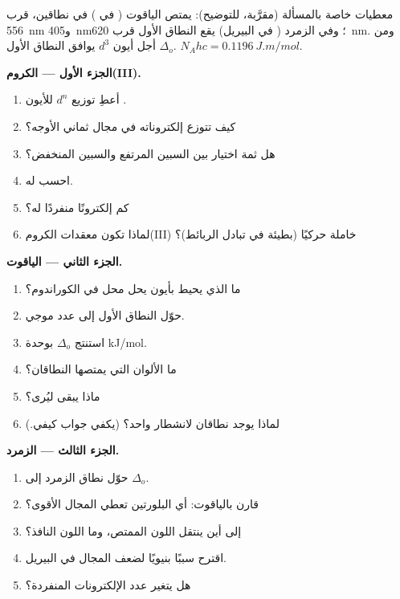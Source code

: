 \begin{problem}
\label{pb:b2:ligand-field:1}
معطيات خاصة بالمسألة (مقرَّبة، للتوضيح): يمتص الياقوت ( في )
في نطاقين، قرب \qty{556}{nm} و\qty{405}{nm}؛ وفي الزمرد ( في البيريل) يقع
النطاق الأول قرب \qty{620}{nm}. ومن أجل أيون $d^3$ يوافق النطاق الأول
$\Delta_o$. $N_Ahc = \qty{0.1196}{J.m/mol}$.

\medskip
\noindent\textbf{الجزء الأول --- الكروم(III).}
\begin{enumerate}
  \item أعطِ توزيع $d^n$ للأيون .
  \item كيف تتوزع إلكتروناته في مجال ثماني الأوجه؟
  \item هل ثمة اختيار بين السبين المرتفع والسبين المنخفض؟
  \item احسب  له.
  \item كم إلكترونًا منفردًا له؟
  \item لماذا تكون معقدات الكروم(III) خاملة حركيًا (بطيئة في تبادل الربائط)؟
\end{enumerate}

\medskip
\noindent\textbf{الجزء الثاني --- الياقوت.}
\begin{enumerate}[resume]
  \item ما الذي يحيط بأيون  يحل محل  في الكوراندوم؟
  \item حوّل النطاق الأول إلى عدد موجي.
  \item استنتج $\Delta_o$ بوحدة \unit{kJ/mol}.
  \item ما الألوان التي يمتصها النطاقان؟
  \item ماذا يبقى ليُرى؟
  \item لماذا يوجد نطاقان لانشطار واحد؟ (يكفي جواب كيفي.)
\end{enumerate}

\medskip
\noindent\textbf{الجزء الثالث --- الزمرد.}
\begin{enumerate}[resume]
  \item حوّل نطاق الزمرد إلى $\Delta_o$.
  \item قارن بالياقوت: أي البلورتين تعطي المجال الأقوى؟
  \item إلى أين ينتقل اللون الممتص، وما اللون النافذ؟
  \item اقترح سببًا بنيويًا لضعف المجال في البيريل.
  \item هل يتغير عدد الإلكترونات المنفردة؟
\end{enumerate}


\end{problem}
